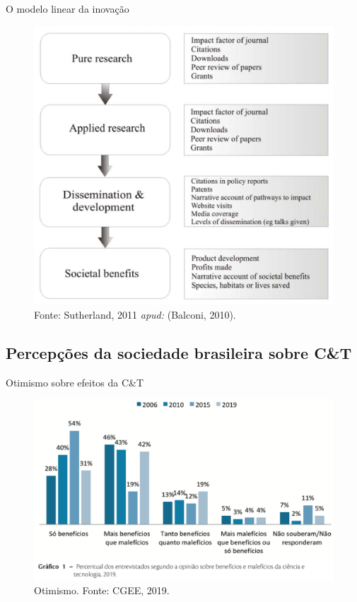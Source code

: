 \begin{frame}{O modelo linear da inovação}
\begin{figure}
\centering
\includegraphics[scale=0.2]{figs/01/modelo-linear}
\caption{\small{Fonte: Sutherland, 2011 \textit{apud:} (Balconi, 2010).}}
\end{figure}
\end{frame}

\subsection*{Percepções da sociedade brasileira sobre C{\&}T}

\begin{frame}{Otimismo sobre efeitos da C{\&}T}
\begin{figure}
\centering
\includegraphics[scale=0.25]{figs/01/cet-otimismo}
\caption{Otimismo. Fonte: CGEE, 2019.}
\end{figure}
\end{frame}

